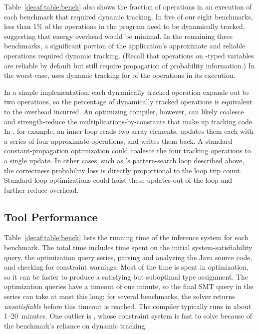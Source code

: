 Table~\ref{decaf:table:bench} also shows the fraction of operations in an execution
of each benchmark that required dynamic tracking.
In five of our eight benchmarks, less than 1\% of the operations in the
program need to be dynamically tracked, suggesting that energy overhead would
be minimal.
In the remaining three benchmarks, a significant portion of the application's
approximate and reliable operations required dynamic tracking.
(Recall that operations on -typed variables are reliable by default
but still require propagation of probability information.)
In the worst case,  uses dynamic tracking for  of
the operations in its execution.

In a simple implementation, each dynamically tracked operation expands out to
two operations, so
the percentage of dynamically tracked operations is equivalent to the
overhead incurred.
An optimizing compiler, however, can likely coalesce and strength-reduce the
multiplications-by-constants that make up tracking code.
In , for example, an inner loop reads two array elements, updates
them each with a series of four approximate operations, and writes them back.
A standard constant-propagation optimization could coalesce the four tracking
operations to a single update.
In other cases, such as 's pattern-search loop described above,
the correctness probability loss is directly proportional to the loop trip
count.
Standard loop optimizations could hoist these updates out of the loop and
further reduce overhead.


\subsection{Tool Performance}

Table~\ref{decaf:table:bench} lists the running time of the inference system for
each benchmark.
The total time includes time spent on the initial system-satisfiability query,
the optimization query series, parsing and analyzing the Java
source code, and checking for \lang constraint warnings.
Most of the time is spent in optimization, so it can be faster to produce a
satisfying but suboptimal type assignment.
The optimization queries have a timeout of one minute, so the final SMT query
in the series can take at most this long; for several benchmarks, the solver
returns \emph{unsatisfiable} before this timeout is reached.
The compiler typically runs in about 1--20~minutes.
One outlier is , whose constraint system is fast to solve because of
the benchmark's reliance on dynamic tracking.

